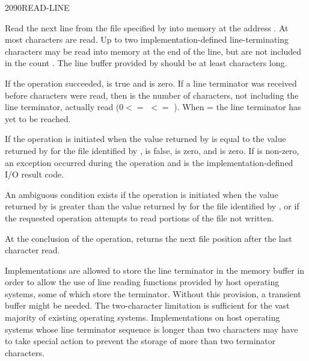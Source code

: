 \vspace*{-3ex}
\begin{worddef}{2090}{READ-LINE}
\item {}

	Read the next line from the file specified by  into
	memory at the address . At most  characters
	are read. Up to two implementation-defined line-terminating
	characters may be read into memory at the end of the line, but
	are not included in the count . The line buffer provided
	by  should be at least  characters long.

	If the operation succeeded,  is true and 
	is zero. If a line terminator was received before 
	characters were read, then  is the number of characters,
	not including the line terminator, actually read ($0 <=$ 
	$<=$ ). When  =  the line
	terminator has yet to be reached.

	If the operation is initiated when the value returned by
	 is equal to the value returned by
	 for the file identified by ,
	 is false,  is zero, and  is zero.
	If  is non-zero, an exception occurred during the
	operation and  is the implementation-defined I/O
	result code.

	An ambiguous condition exists if the operation is initiated when
	the value returned by  is greater than the
	value returned by  for the file identified by
	, or if the requested operation attempts to read
	portions of the file not written.

	At the conclusion of the operation,  returns
	the next file position after the last character read.

	\begin{rationale} %
		Implementations are allowed to store the line terminator in
		the memory buffer in order to allow the use of line reading
		functions provided by host operating systems, some of which
		store the terminator. Without this provision, a transient
		buffer might be needed. The two-character limitation is
		sufficient for the vast majority of existing operating
		systems. Implementations on host operating systems whose line
		terminator sequence is longer than two characters may have to
		take special action to prevent the storage of more than two
		terminator characters.


\end{rationale}
\end{worddef}
